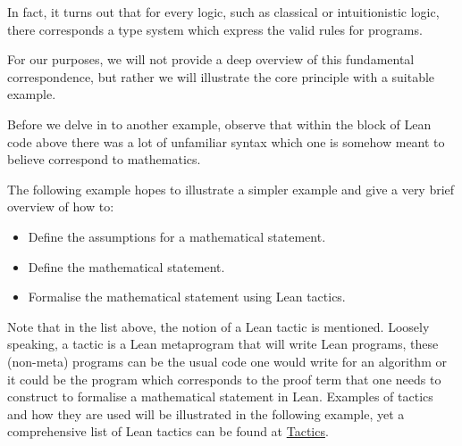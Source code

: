 In fact, it turns out that for every logic, such as classical or intuitionistic logic, there corresponds a type system which express the valid rules for programs. 

For our purposes, we will not provide a deep overview of this fundamental correspondence, but rather we will illustrate the core principle with a suitable example.

Before we delve in to another example, observe that within the block of Lean code above there was a lot of unfamiliar syntax which one is somehow meant to believe correspond to mathematics. 

The following example hopes to illustrate a simpler example and give a very brief overview of how to:

\begin{itemize}
    \item Define the assumptions for a mathematical statement.
    \item Define the mathematical statement.
    \item Formalise the mathematical statement using Lean tactics.
\end{itemize}

Note that in the list above, the notion of a Lean tactic is mentioned. Loosely speaking, a tactic is a Lean metaprogram that will write Lean programs, these (non-meta) programs can
be the usual code one would write for an algorithm or it could be the program which corresponds to the proof term that one needs to construct to formalise
a mathematical statement in Lean. Examples of tactics and how they are used will be illustrated in the following example, yet a comprehensive list of Lean tactics can be found at \href{https://lean-lang.org/doc/reference/latest//Tactic-Proofs/Tactic-Reference/}{Tactics}.

